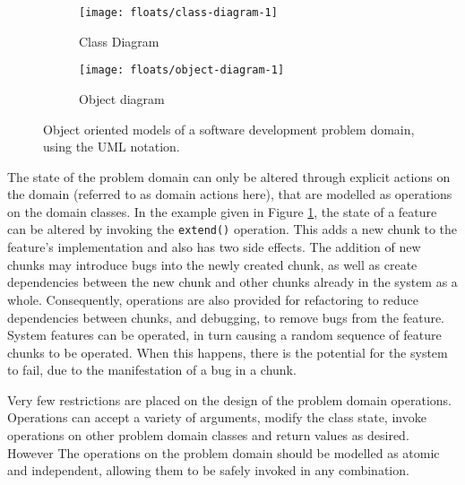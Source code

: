 \documentclass{sig-alternate}
\begin{document}
\begin{figure}
  \centering

  \begin{subfigure}{\linewidth}
    \centering
    \texttt{[image: floats/class-diagram-1]}
    \caption{Class Diagram}
    \label{fig:feature-class-diagram}
  \end{subfigure}

  \vspace{10pt}

  \begin{subfigure}{\linewidth}
    \centering
    \texttt{[image: floats/object-diagram-1]}
    \caption{Object diagram}
    \label{fig:feature-instance-diagram}
  
  \end{subfigure}

  \vspace{10pt}

  
  \caption{Object oriented models of a software development problem domain, using the UML notation.}

\end{figure}

The state of the problem domain can only be altered through explicit actions on the domain (referred to as domain
actions here), that are modelled as operations on the domain classes.  In the example given in Figure
\ref{fig:feature-class-diagram}, the state of a feature can be altered by invoking the \lstinline!extend()!  operation.
This adds a new chunk to the feature's implementation and also has two side effects. The addition of new chunks may
introduce bugs into the newly created chunk, as well as create dependencies between the new chunk and other chunks
already in the system as a whole.  Consequently, operations are also provided for refactoring to reduce dependencies
between chunks, and debugging, to remove bugs from the feature.  System features can be operated, in turn causing a
random sequence of feature chunks to be operated.  When this happens, there is the potential for the system to fail, due
to the manifestation of a bug in a chunk.

Very few restrictions are placed on the design of the problem domain operations.  Operations can accept a variety of
arguments, modify the class state, invoke operations on other problem domain classes and return values as desired.
However The operations on the problem domain should be modelled as atomic and independent, allowing them to be safely
invoked in any combination.
\end{document}
